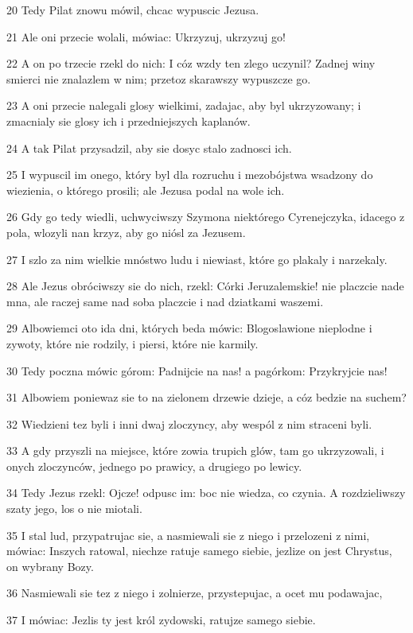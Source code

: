 \par 20 Tedy Pilat znowu mówil, chcac wypuscic Jezusa.
\par 21 Ale oni przecie wolali, mówiac: Ukrzyzuj, ukrzyzuj go!
\par 22 A on po trzecie rzekl do nich: I cóz wzdy ten zlego uczynil? Zadnej winy smierci nie znalazlem w nim; przetoz skarawszy wypuszcze go.
\par 23 A oni przecie nalegali glosy wielkimi, zadajac, aby byl ukrzyzowany; i zmacnialy sie glosy ich i przedniejszych kaplanów.
\par 24 A tak Pilat przysadzil, aby sie dosyc stalo zadnosci ich.
\par 25 I wypuscil im onego, który byl dla rozruchu i mezobójstwa wsadzony do wiezienia, o którego prosili; ale Jezusa podal na wole ich.
\par 26 Gdy go tedy wiedli, uchwyciwszy Szymona niektórego Cyrenejczyka, idacego z pola, wlozyli nan krzyz, aby go niósl za Jezusem.
\par 27 I szlo za nim wielkie mnóstwo ludu i niewiast, które go plakaly i narzekaly.
\par 28 Ale Jezus obróciwszy sie do nich, rzekl: Córki Jeruzalemskie! nie placzcie nade mna, ale raczej same nad soba placzcie i nad dziatkami waszemi.
\par 29 Albowiemci oto ida dni, których beda mówic: Blogoslawione nieplodne i zywoty, które nie rodzily, i piersi, które nie karmily.
\par 30 Tedy poczna mówic górom: Padnijcie na nas! a pagórkom: Przykryjcie nas!
\par 31 Albowiem poniewaz sie to na zielonem drzewie dzieje, a cóz bedzie na suchem?
\par 32 Wiedzieni tez byli i inni dwaj zloczyncy, aby wespól z nim straceni byli.
\par 33 A gdy przyszli na miejsce, które zowia trupich glów, tam go ukrzyzowali, i onych zloczynców, jednego po prawicy, a drugiego po lewicy.
\par 34 Tedy Jezus rzekl: Ojcze! odpusc im: boc nie wiedza, co czynia. A rozdzieliwszy szaty jego, los o nie miotali.
\par 35 I stal lud, przypatrujac sie, a nasmiewali sie z niego i przelozeni z nimi, mówiac: Inszych ratowal, niechze ratuje samego siebie, jezlize on jest Chrystus, on wybrany Bozy.
\par 36 Nasmiewali sie tez z niego i zolnierze, przystepujac, a ocet mu podawajac,
\par 37 I mówiac: Jezlis ty jest król zydowski, ratujze samego siebie.
